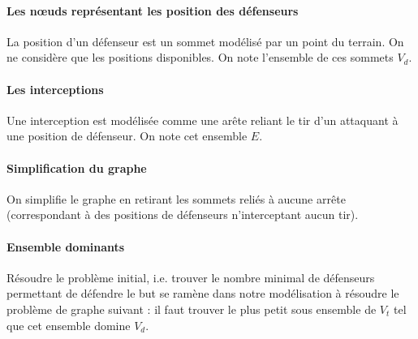 \documentclass{article}
\begin{document}
\paragraph{Les n\oe uds représentant les position des défenseurs}
La position d'un défenseur est un sommet modélisé par un point du terrain. On ne considère que les positions disponibles. On note l'ensemble de ces sommets $V_d$.

\paragraph{Les interceptions}
Une interception est modélisée comme une arête reliant le tir d'un attaquant à une position de défenseur. On note cet ensemble $E$.

\paragraph{Simplification du graphe}
On simplifie le graphe en retirant les sommets reliés à aucune arrête (correspondant à des positions de défenseurs n'interceptant aucun tir).

\paragraph{Ensemble dominants}
Résoudre le problème initial, i.e. trouver le nombre minimal de défenseurs permettant de défendre le but se ramène dans notre modélisation à résoudre le problème de graphe suivant : il faut trouver le plus petit sous ensemble de $V_t$ tel que cet ensemble domine $V_d$.

\end{document}
